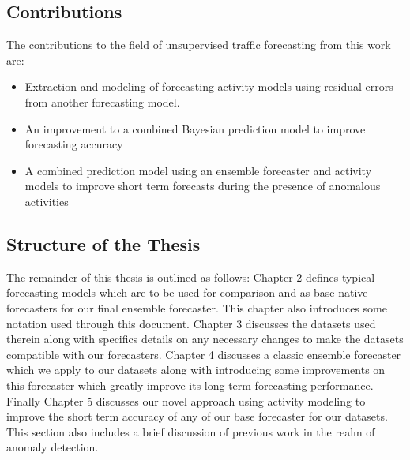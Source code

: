\subsection{Contributions}  
The contributions to the field of unsupervised traffic forecasting from this work are:
\begin{itemize}
\item{Extraction and modeling of forecasting activity models using residual errors from another forecasting model.}
\item{An improvement to a combined Bayesian prediction model to improve forecasting accuracy}
\item{A combined prediction model using an ensemble forecaster and activity models to improve short term forecasts during the presence of anomalous activities}
\end{itemize}

\subsection{Structure of the Thesis}
The remainder of this thesis is outlined as follows: Chapter 2 defines typical forecasting models which are to be used for comparison and as base native forecasters for our final ensemble forecaster.  This chapter also introduces some notation used through this document.  Chapter 3 discusses the datasets used therein along with specifics details on any necessary changes to make the datasets compatible with our forecasters.  Chapter 4 discusses a classic ensemble forecaster which we apply to our datasets along with introducing some improvements on this forecaster which greatly improve its long term forecasting performance.  Finally Chapter 5 discusses our novel approach using activity modeling to improve the short term accuracy of any of our base forecaster for our datasets.  This section also includes a brief discussion of previous work in the realm of anomaly detection.